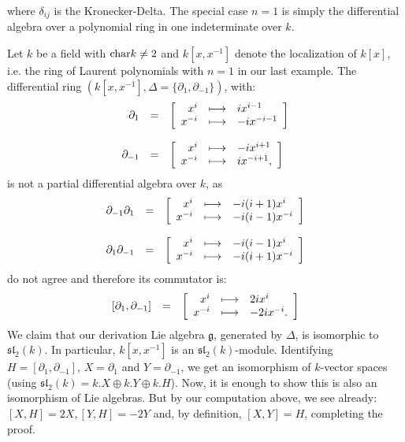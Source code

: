 where $\delta_{ij}$ is the Kronecker-Delta. The special case $n = 1$ is simply the differential algebra over a polynomial ring in one indeterminate over $k$.
\item\label{partial_diff_exp02} Let $k$ be a field with $\trm{char} k \neq 2$ and $k[x,x^{-1}]$ denote the localization of $k[x]$, i.e. the ring of Laurent polynomials with $n = 1$ in our last example. The differential ring $(k[x,x^{-1}], \Delta = \{\partial_1, \partial_{-1}\})$, with:
$$\bao{rcl}
\partial_1 &=& \left[
\bao{rcl}
x^i &\longmapsto& i x^{i-1}\\
x^{-i}&\longmapsto& -i x^{-i-1}\\
\ea\right]\\
&&\\
\partial_{-1} &=& \left[
\bao{rcl}
x^i &\longmapsto& -i x^{i+1}\\
x^{-i} &\longmapsto& i x^{-i+1},\\
\ea\right]\\
\ea$$
is not a partial differential algebra over $k$, as
$$\bao{rcl}
\partial_{-1} \partial_1 &=& \left[
\bao{rcl}
x^i &\longmapsto& -i (i + 1) x^i\\
x^{-i}&\longmapsto& -i (i - 1) x^{-i}\\
\ea\right]\\
&&\\
\partial_1 \partial_{-1} &=& \left[
\bao{rcl}
x^i &\longmapsto& -i (i - 1) x^i\\
x^{-i}&\longmapsto& -i (i + 1) x^{-i}\\
\ea\right]\\
\ea$$
do not agree and therefore its commutator is:
$$\bao{rcl}
[\partial_1,\partial_{-1}] &=& \left[\bao{rcl}
x^i &\longmapsto& 2 i x^i\\
x^{-i} &\longmapsto& -2 i x^{-i}.\\
\ea\right]\\\ea$$
We claim that our derivation Lie algebra $\mathfrak{g}$, generated by $\Delta$, is isomorphic to $\mathfrak{sl}_2(k)$. In particular, $k[x,x^{-1}]$ is an $\mathfrak{sl}_2(k)$-module. Identifying $H = [\partial_1,\partial_{-1}]$, $X = \partial_1$ and $Y = \partial_{-1}$, we get an isomorphism of $k$-vector spaces (using $\mathfrak{sl}_2(k) = k.X \oplus k.Y \oplus k.H$). Now, it is enough to show this is also an isomorphism of Lie algebras. But by our computation above, we see already: $[X,H] = 2 X, [Y,H] = -2 Y$ and, by definition, $[X,Y] = H$, completing the proof.
\en
